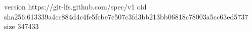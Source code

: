 version https://git-lfs.github.com/spec/v1
oid sha256:613339a4cc884d4c4fe5fcbe7e507c3fd3bb213bb06818c78003a5cc63ed5737
size 347433
